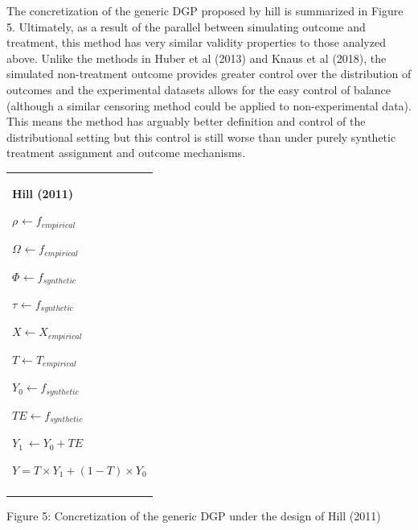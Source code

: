 \documentclass[../main.tex]{subfiles}
\begin{document}
\vspace{\baselineskip}
The concretization of the generic DGP proposed by hill is summarized in Figure 5. Ultimately, as a result of the parallel between simulating outcome and treatment, this method has very similar validity properties to those analyzed above. Unlike the methods in Huber et al (2013) and Knaus et al (2018), the simulated non-treatment outcome provides greater control over the distribution of outcomes and the experimental datasets allows for the easy control of balance (although a similar censoring method could be applied to non-experimental data). This means the method has arguably better definition and control of the distributional setting but this control is still worse than under purely synthetic treatment assignment and outcome mechanisms.\par


\vspace{\baselineskip}




\begin{table}[H]
 			\centering
\begin{tabular}{p{3.14in}}
\hline
\multicolumn{1}{|p{3.14in}|}{\textbf{Hill (2011)} \par  \(  \rho _{} \leftarrow f_{empirical}~ \)  \par  \(  \Omega _{} \leftarrow f_{empirical} \)  \par  \(  \Phi _{} \leftarrow f_{synthetic} \)  \par  \(  \tau_{} \leftarrow f_{synthetic}~ \)  \par  \( X \leftarrow X_{empirical} \)  \par  \( T \leftarrow T_{empirical} \)  \par  \( Y_{0} \leftarrow f_{synthetic} \)  \par  \( TE \leftarrow f_{synthetic} \)  \par  \( Y_{1}~ \leftarrow Y_{0}+ TE \)  \par  \( Y = T \times Y_{1}+  \left( 1-T \right)  \times Y_{0} \)  \par } \\
\hhline{-}

\end{tabular}
 \end{table}




\vspace{\baselineskip}
Figure 5: Concretization of the generic DGP under the design of Hill (2011)\par
\end{document}
